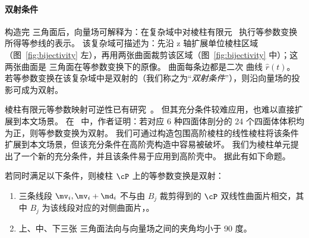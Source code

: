 \paragraph{双射条件}
构造完 \Bezier 三角面后，向量场可解释为：在复杂域中对棱柱有限元~\cite{Ciarlet1991BasicEE} 执行等参数变换所得等参线的表示。
该复杂域可描述为：先沿 z 轴扩展单位棱柱区域（图~\ref{fig:bijectivity} 左），再用两张曲面裁剪该区域（图~\ref{fig:bijectivity} 中）；这两张曲面是 \Bezier 三角面在等参数变换下的原像。
曲面每条边都是二次 \Bezier 曲线 $\hat{r}(t)$。
若等参数变换在该复杂域中是双射的（我们称之为“\emph{双射条件}”），则沿向量场的投影可成为双射。

%
棱柱有限元等参数映射可逆性已有研究~\cite{Knabner2001TheIO}。
但其充分条件较难应用，也难以直接扩展到本文场景。
%
在~\cite{Jiang2020BijectivePI} 中，作者证明：若对应 6 种四面体剖分的 24 个四面体体积均为正，则等参数变换为双射。
我们可通过构造包围高阶棱柱的线性棱柱将该条件扩展到本文场景，但该充分条件在高阶壳构造中容易被破坏。
%
我们为棱柱单元提出了一个新的充分条件，并且该条件易于应用到高阶壳中。
据此有如下命题。
\begin{prop}\label{prop:bijective}
    若同时满足以下条件，则棱柱 $\cP$ 上的等参数变换是双射：
    \begin{enumerate}
    	\item[(\invariant)] 三条线段 $\mv_i,\mv_i+\md_i$ 不与由 $B_{j}$ 裁剪得到的 $\cP$ 双线性曲面片相交，其中 $B_j$ 为该线段对应的对侧曲面片，。
    	\item[(\invariant)] 上、中、下三张 \Bezier 三角面法向与向量场之间的夹角均小于 90 度。
    \end{enumerate}
\end{prop}
